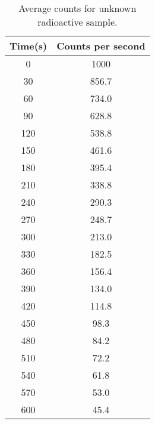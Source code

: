 \documentclass[11pt,a4paper]{article}
\begin{document}
\begin{table}[h!]
    \centering
    \caption{Average counts for unknown radioactive sample.}
        \begin{tabular}{|c|c|}
            \hline
            Time(s)&
            Counts per second\\
            \hline
            0&1000\\
            30&856.7\\
            60&734.0\\
            90&628.8\\
            120&538.8\\
            150&461.6\\
            180&395.4\\
            210&338.8\\
            240&290.3\\
            270&248.7\\
            300&213.0\\
            330&182.5\\
            360&156.4\\
            390&134.0\\
            420&114.8\\
            450&98.3\\
            480&84.2\\
            510&72.2\\
            540&61.8\\
            570&53.0\\
            600&45.4\\
            \hline
        \end{tabular}
    \label{tab-half-life}
\end{table}

\newpage


\setlength{\bibhang}{0pt}

\end{document}
